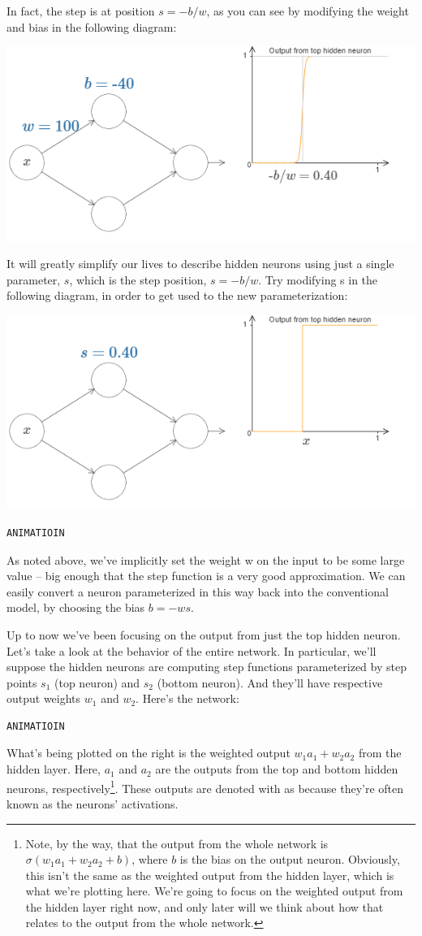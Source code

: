 \documentclass[a4paper,twoside,10pt]{book}
\begin{document}
In fact, the step is at position $s=-b/w$, as you can see by modifying the weight and bias in the following diagram:
\begin{center}
	\includegraphics[width=0.7\linewidth]{figures/ch4/tikz404}
\end{center}
It will greatly simplify our lives to describe hidden neurons using just a single parameter, $s$, which is the step position, $s=-b/w$. Try modifying s in the following diagram, in order to get used to the new parameterization:
\begin{center}
	\includegraphics[width=0.7\linewidth]{figures/ch4/tikz405}
\end{center}
\begin{lstlisting}
ANIMATIOIN
\end{lstlisting}
As noted above, we've implicitly set the weight w on the input to be some large value -- big enough that the step function is a very good approximation. We can easily convert a neuron parameterized in this way back into the conventional model, by choosing the bias $b=-ws$.

Up to now we've been focusing on the output from just the top hidden neuron. Let's take a look at the behavior of the entire network. In particular, we'll suppose the hidden neurons are computing step functions parameterized by step points $s_1$ (top neuron) and $s_2$ (bottom neuron). And they'll have respective output weights $w_1$ and $w_2$. Here's the network:
\begin{lstlisting}
ANIMATIOIN
\end{lstlisting}
What's being plotted on the right is the weighted output $w_1a_1+w_2a_2$ from the hidden layer. Here, $a_1$ and $a_2$ are the outputs from the top and bottom hidden neurons, respectively\footnote{Note, by the way, that the output from the whole network is $\sigma(w_1a_1+w_2a_2+b)$, where $b$ is the bias on the output neuron. Obviously, this isn't the same as the weighted output from the hidden layer, which is what we're plotting here. We're going to focus on the weighted output from the hidden layer right now, and only later will we think about how that relates to the output from the whole network.}. These outputs are denoted with as because they're often known as the neurons' activations.
\end{document}
